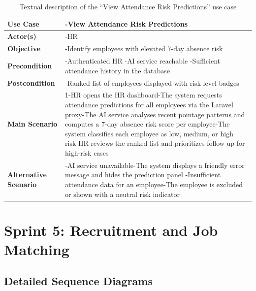 \begin{table}[H]
\centering
\caption{Textual description of the ``View Attendance Risk Predictions'' use case}
\label{tab:attendance-risk}
\begin{tabular}{|p{}|p{}|}
    \hline
   \textbf{Use Case} & -View Attendance Risk Predictions \\
    \hline
    \textbf{Actor(s)} & -HR \\
    \hline
    \textbf{Objective} & -Identify employees with elevated 7-day absence risk \\
    \hline
    \textbf{Precondition} & -Authenticated HR\newline
-AI service reachable\newline
-Sufficient attendance history in the database \\
    \hline
    \textbf{Postcondition} & -Ranked list of employees displayed with risk level badges \\
    \hline
    \textbf{Main Scenario}
    & 1-HR opens the HR dashboard\newline
2-The system requests attendance predictions for all employees via the Laravel proxy\newline
3-The AI service analyses recent pointage patterns and computes a 7-day absence risk score per employee\newline
4-The system classifies each employee as low, medium, or high risk\newline
5-HR reviews the ranked list and prioritizes follow-up for high-risk cases \\ \hline
    \textbf{Alternative Scenario}
    & -AI service unavailable\newline
1-The system displays a friendly error message and hides the prediction panel\newline
\newline
-Insufficient attendance data for an employee\newline
1-The employee is excluded or shown with a neutral risk indicator \\ \hline
\end{tabular}
\end{table}

\section{Sprint 5: Recruitment and Job Matching}

\subsection{Detailed Sequence Diagrams}

